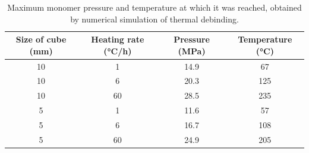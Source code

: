 \documentclass{article}
\begin{document}
\begin{table}
    \centering
    \caption{
        Maximum monomer pressure and temperature at which it was reached,
        obtained by numerical simulation of thermal debinding.
    }\label{table:tb:pressure}
    \centering
    \footnotesize
    \begin{tabular}{cccc}
        \hline
        Size of cube (\si{\mm}) & Heating rate (\si{\celsius/\hour})
            & Pressure (\si{\MPa}) & Temperature (\si{\celsius}) \\
        \hline
        10 & 1  & 14.9 & 67  \\
        10 & 6  & 20.3 & 125 \\
        10 & 60 & 28.5 & 235 \\
        5  & 1  & 11.6 & 57  \\
        5  & 6  & 16.7 & 108 \\
        5  & 60 & 24.9 & 205 \\
        \hline
    \end{tabular}
\end{table}
\end{document}
